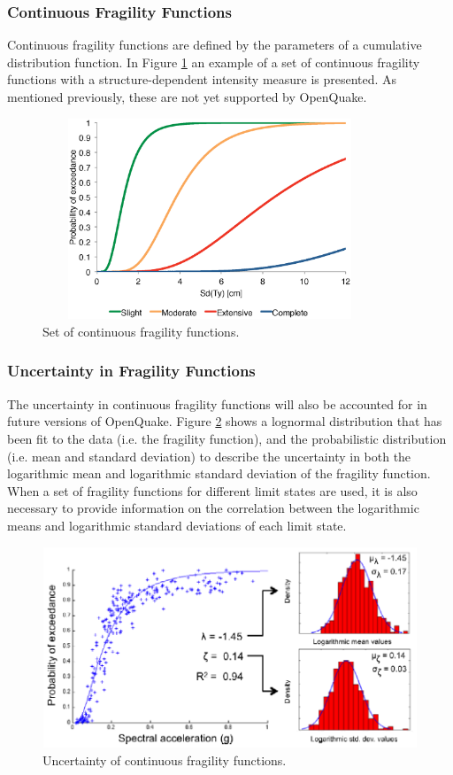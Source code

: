 \subsubsection{Continuous Fragility Functions}
Continuous fragility functions are defined by the parameters of a cumulative distribution function. In Figure \ref{fig:FFcontinuous} an example of a set of continuous fragility functions with a structure-dependent intensity measure is presented. As mentioned previously, these are not yet supported by OpenQuake.

\begin{figure}[ht]
\centering
\includegraphics[width=10cm,height=6cm]{./Figures/Part_Risk/FFContinuous.eps}
\caption{Set of continuous fragility functions.}
\label{fig:FFcontinuous}
\end{figure}

\subsubsection{Uncertainty in Fragility Functions}
The uncertainty in continuous fragility functions will also be accounted for in future versions of OpenQuake. Figure \ref{fig:FF_uncertainty} shows a lognormal distribution that has been fit to the data (i.e. the fragility function), and the probabilistic distribution (i.e. mean and standard deviation) to describe the uncertainty in both the logarithmic mean and logarithmic standard deviation of the fragility function. When a set of fragility functions for different limit states are used, it is also necessary to provide information on the correlation between the logarithmic means and logarithmic standard deviations of each limit state.

\begin{figure}[ht]
\centering
\includegraphics[width=12cm,height=6cm]{./Figures/Part_Risk/FFuncertainty.eps}
\caption{Uncertainty of continuous fragility functions.}
\label{fig:FF_uncertainty}
\end{figure}

